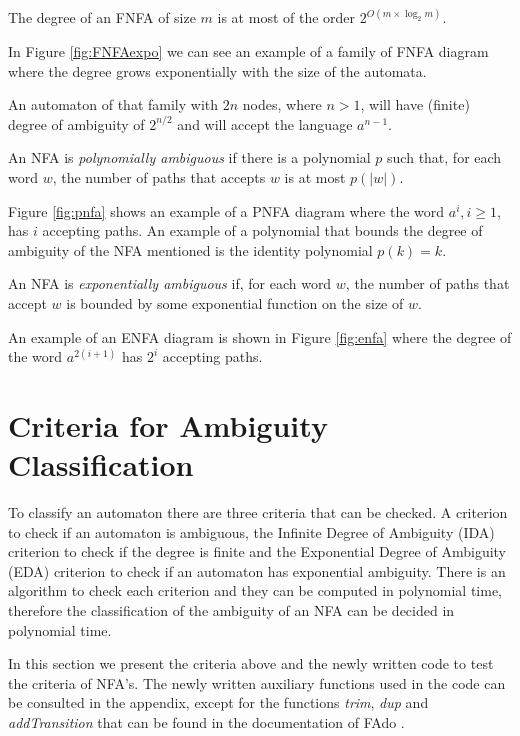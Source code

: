 \begin{lemma} \textbf{\cite{Seidl89}}
The degree of an FNFA of size $m$ is at most of the order $2^{O(m\times \log_2 m)}$.
\end{lemma}

In Figure \ref{fig:FNFAexpo} we can see an example of a family of FNFA diagram where the degree grows exponentially with the size of the automata.

An automaton of that family with $2n$ nodes, where $n>1$, will have (finite) degree of ambiguity of $2^{n/2}$ and will accept the language $a^{n-1}$.

\begin{definition}
An NFA is \emph{polynomially ambiguous} if there is a polynomial $p$ such that, for each word $w$, the number of paths that accepts $w$ is at most $p(|w|)$.
\end{definition}

Figure \ref{fig:pnfa} shows an example of a PNFA diagram  where the word $a^i, i \geq 1$, has $i$ accepting paths. An example of a polynomial that bounds the degree of ambiguity of the NFA mentioned is the identity polynomial $p(k) = k$.

\begin{definition}
An NFA is \emph{exponentially ambiguous} if, for each word $w$, the number of paths that accept $w$ is bounded by some exponential function on the size of $w$.
\end{definition}

An example of an ENFA diagram is shown in Figure \ref{fig:enfa} where the degree of the word $a^{2(i+1)}$ has $2^i$ accepting paths.

\section{Criteria for Ambiguity Classification}
To classify an automaton there are three criteria that can be checked. A criterion to check if an automaton is ambiguous, the Infinite Degree of Ambiguity (IDA) criterion to check if the degree is finite and the Exponential Degree of Ambiguity (EDA) criterion to check if an automaton has exponential ambiguity. There is an algorithm to check each criterion and they can be computed in polynomial time, therefore the classification of the ambiguity of an NFA can be decided in polynomial time.

In this section we present the criteria above and the newly written code to test the criteria of NFA's. The newly written auxiliary functions used in the code can be consulted in the appendix, except for the functions \emph{trim}, \emph{dup} and \emph{addTransition} that can be found in the documentation of FAdo \cite{BRODA201994}.

